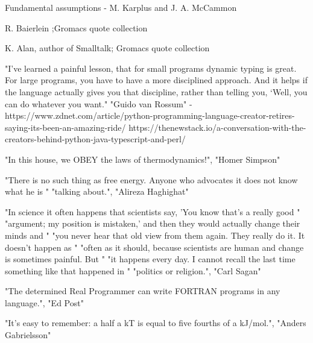


{Fundamental assumptions - M. Karplus  and J. A. McCammon \cite{Karplus2002}}

{R. Baierlein ;Gromacs quote collection \cite{Abraham2015}}




{K. Alan, author of Smalltalk; Gromacs quote collection \cite{Abraham2015}}


"I’ve learned a painful lesson, that for small programs dynamic typing is great. For large programs, you have to have a more disciplined approach. And it helps if the language actually gives you that discipline, rather than telling you, ‘Well, you can do whatever you want." "Guido van Rossum" - https://www.zdnet.com/article/python-programming-language-creator-retires-saying-its-been-an-amazing-ride/
https://thenewstack.io/a-conversation-with-the-creators-behind-python-java-typescript-and-perl/


"In this house, we OBEY the laws of thermodynamics!", "Homer Simpson"


"There is no such thing as free energy. Anyone who advocates it does not know what he is "
          "talking about.",
          "Alireza Haghighat" 
          
          
          
"In science it often happens that scientists say, 'You know that's a really good "
          "argument; my position is mistaken,' and then they would actually change their minds and "
          "you never hear that old view from them again. They really do it. It doesn't happen as "
          "often as it should, because scientists are human and change is sometimes painful. But "
          "it happens every day. I cannot recall the last time something like that happened in "
          "politics or religion.",
          "Carl Sagan"
          
          
"The determined Real Programmer can write FORTRAN programs in any language.", "Ed Post"


"It's easy to remember: a half a kT is equal to five fourths of a kJ/mol.",
          "Anders Gabrielsson"
          
